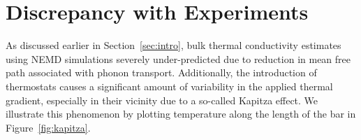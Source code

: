 \section{Discrepancy with Experiments}
\label{sec:response}

As discussed earlier in Section~\ref{sec:intro}, bulk thermal conductivity estimates using NEMD simulations
severely under-predicted due to reduction in mean free path associated with phonon transport. Additionally, the
introduction of thermostats causes a significant amount of variability in the applied thermal gradient, especially
in their vicinity due to a so-called Kapitza effect. We illustrate this phenomenon by plotting temperature along
the length of the bar in Figure~\ref{fig:kapitza}. 
